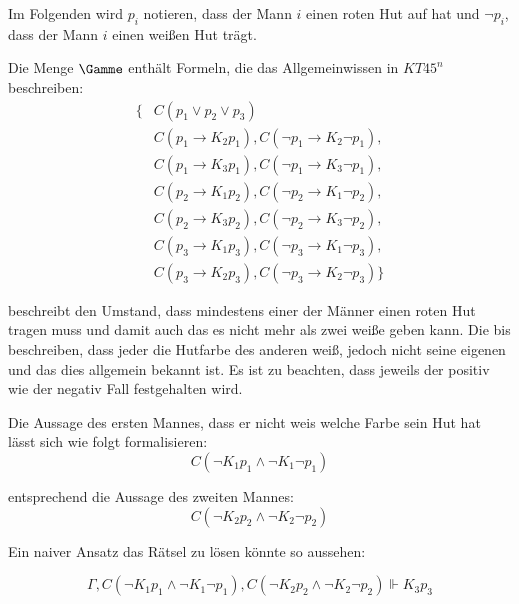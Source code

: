 Im Folgenden wird $p_i$ notieren, dass der Mann $i$ einen roten Hut auf hat und 
$\neg p_i$, dass der Mann $i$ einen weißen Hut trägt.

Die Menge $\Gamme$ enthält Formeln, die das Allgemeinwissen in $KT45^n$ beschreiben:
\begin{subequations}
	\begin{align}
		\{&C(p_1 \vee p_2 \vee p_3) \label{eq:min_ein_roter_hut}\\
		\label{eq:zweiter_kennt_farbe_von_erster}
		&C(p_1 \rightarrow K_2 p_1), C(\neg p_1 \rightarrow K_2 \neg p_1),\\
		&C(p_1 \rightarrow K_3 p_1), C(\neg p_1 \rightarrow K_3 \neg p_1),\\
		&C(p_2 \rightarrow K_1 p_2), C(\neg p_2 \rightarrow K_1 \neg p_2),\\
		&C(p_2 \rightarrow K_3 p_2), C(\neg p_2 \rightarrow K_3 \neg p_2),\\
		&C(p_3 \rightarrow K_1 p_3), C(\neg p_3 \rightarrow K_1 \neg p_3),\\
		\label{eq:zweiter_kennt_farbe_von_letzter}
		&C(p_3 \rightarrow K_2 p_3), C(\neg p_3 \rightarrow K_2 \neg p_3)\}
	\end{align}
\end{subequations}

 beschreibt den Umstand, dass mindestens einer der Männer einen roten Hut tragen muss und damit auch das es nicht mehr als zwei weiße geben kann.
Die  bis  beschreiben, dass jeder die Hutfarbe des anderen weiß, jedoch nicht seine eigenen und das dies allgemein bekannt ist.
Es ist zu beachten, dass jeweils der positiv wie der negativ Fall festgehalten wird.

Die Aussage des ersten Mannes, dass er nicht weis welche Farbe sein Hut hat lässt sich wie folgt formalisieren:
\begin{equation*}
	C(\neg K_1 p_1 \wedge \neg K_1 \neg p_1)
\end{equation*}

entsprechend die Aussage des zweiten Mannes:
\begin{equation*}
	C(\neg K_2 p_2 \wedge \neg K_2 \neg p_2)
\end{equation*}

Ein naiver Ansatz das Rätsel zu lösen könnte so aussehen:

\begin{equation}
	\Gamma, C(\neg K_1 p_1 \wedge \neg K_1 \neg p_1), C(\neg K_2 p_2 \wedge \neg K_2 \neg p_2) \Vdash K_3 p_3
\end{equation}


